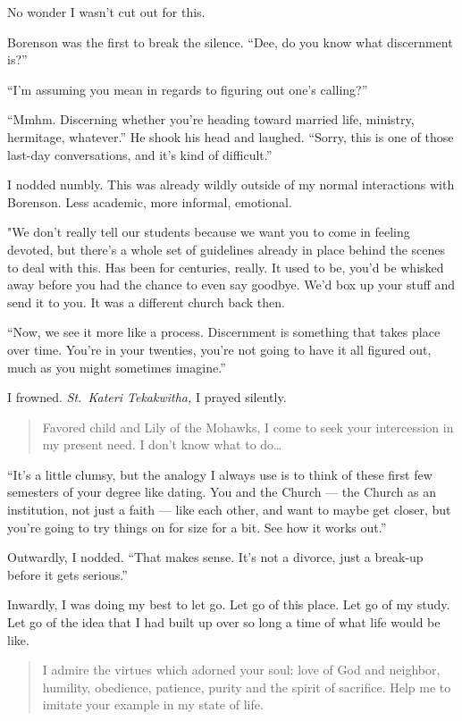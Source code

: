 No wonder I wasn't cut out for this.

Borenson was the first to break the silence. ``Dee, do you know what discernment is?''

``I'm assuming you mean in regards to figuring out one's calling?''

``Mmhm. Discerning whether you're heading toward married life, ministry, hermitage, whatever.'' He shook his head and laughed. ``Sorry, this is one of those last-day conversations, and it's kind of difficult.''

I nodded numbly. This was already wildly outside of my normal interactions with Borenson. Less academic, more informal, emotional.

"We don't really tell our students because we want you to come in feeling devoted, but there's a whole set of guidelines already in place behind the scenes to deal with this. Has been for centuries, really. It used to be, you'd be whisked away before you had the chance to even say goodbye. We'd box up your stuff and send it to you. It was a different church back then.

``Now, we see it more like a process. Discernment is something that takes place over time. You're in your twenties, you're not going to have it all figured out, much as you might sometimes imagine.''

I frowned. \emph{St.~Kateri Tekakwitha,} I prayed silently.

\begin{quote}
Favored child and Lily of the Mohawks, I come to seek your intercession in my present need. I don't know what to do\ldots{}
\end{quote}

``It's a little clumsy, but the analogy I always use is to think of these first few semesters of your degree like dating. You and the Church --- the Church as an institution, not just a faith --- like each other, and want to maybe get closer, but you're going to try things on for size for a bit. See how it works out.''

Outwardly, I nodded. ``That makes sense. It's not a divorce, just a break-up before it gets serious.''

Inwardly, I was doing my best to let go. Let go of this place. Let go of my study. Let go of the idea that I had built up over so long a time of what life would be like.

\begin{quote}
I admire the virtues which adorned your soul: love of God and neighbor, humility, obedience, patience, purity and the spirit of sacrifice. Help me to imitate your example in my state of life.
\end{quote}

